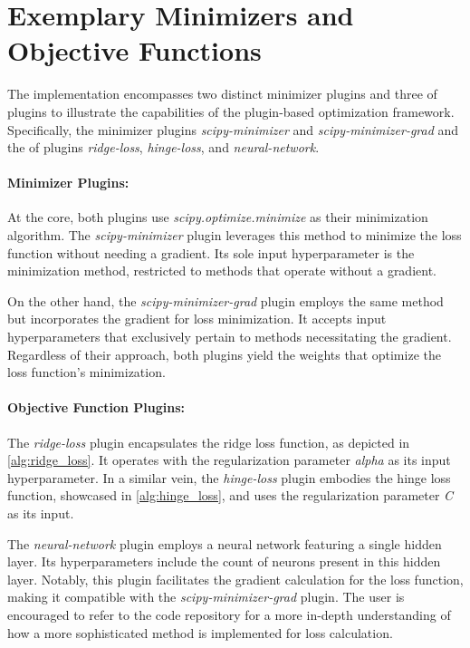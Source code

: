 \documentclass[
  a4paper,  %
  twoside,  %
  bibliography=totoc,
  headsepline,
  cleardoublepage=empty,
  parskip=half,
  draft=false
]{scrbook}
\begin{document}
\section{Exemplary Minimizers and Objective Functions}
\label{sec:exampleMinimizersAndObjectiveFunctions}

The implementation encompasses two distinct minimizer plugins and three \gls{of} plugins to illustrate the capabilities of the plugin-based optimization framework.
Specifically, the minimizer plugins \emph{scipy-minimizer} and \emph{scipy-minimizer-grad} and the \gls{of} plugins \emph{ridge-loss}, \emph{hinge-loss}, and \emph{neural-network}.

\paragraph{Minimizer Plugins:}
\label{sec:minimizerPlugins}

At the core, both plugins use \emph{scipy.optimize.minimize} as their minimization algorithm.
The \emph{scipy-minimizer} plugin leverages this method to minimize the loss function without needing a gradient.
Its sole input hyperparameter is the minimization method, restricted to methods that operate without a gradient.

On the other hand, the \emph{scipy-minimizer-grad} plugin employs the same method but incorporates the gradient for loss minimization.
It accepts input hyperparameters that exclusively pertain to methods necessitating the gradient.
Regardless of their approach, both plugins yield the weights that optimize the loss function's minimization.

\paragraph{Objective Function Plugins:}
\label{sec:objectiveFunctionPlugins}

The \emph{ridge-loss} plugin encapsulates the ridge loss function, as depicted in \ref{alg:ridge_loss}.
It operates with the regularization parameter \emph{alpha} as its input hyperparameter.
In a similar vein, the \emph{hinge-loss} plugin embodies the hinge loss function, showcased in \ref{alg:hinge_loss}, and uses the regularization parameter \emph{C} as its input.

The \emph{neural-network} plugin employs a neural network featuring a single hidden layer.
Its hyperparameters include the count of neurons present in this hidden layer.
Notably, this plugin facilitates the gradient calculation for the loss function, making it compatible with the \emph{scipy-minimizer-grad} plugin.
The user is encouraged to refer to the code repository for a more in-depth understanding of how a more sophisticated method is implemented for loss calculation.
\end{document}
